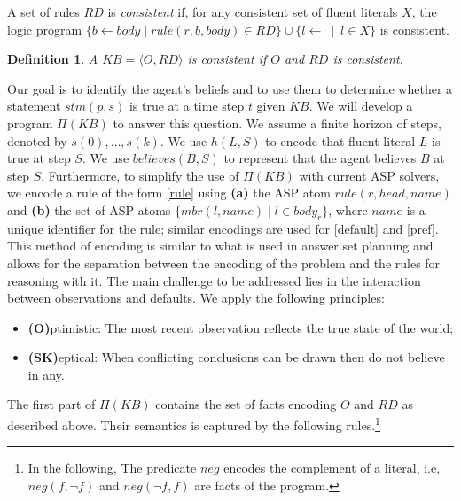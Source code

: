 \documentclass{article}
\newtheorem{definition}{Definition}
\begin{document}
A set of rules $RD$ is \emph{consistent} if, for any consistent set of fluent literals $X$, the logic program 
$\{b \leftarrow body  \mid rule(r, b, body) \in RD\} \cup \{l \leftarrow \:\mid\: l\in X\}$
is consistent.
%
\begin{definition}
A $KB = \langle O, RD \rangle$ is \emph{consistent} if $O$ and $RD$ is consistent. 
\end{definition} 
%
Our goal is to identify the agent's beliefs and to use them to determine whether  a statement $stm(p, s)$ is true at a time step $t$ given $KB$. We will develop a program $\Pi(KB)$ to answer this question. We assume a finite horizon of steps, denoted by $s(0), \ldots, s(k)$. We use $h(L,S)$ to encode that fluent literal $L$ is true at step $S$. We use $believes(B,S)$ to represent that the agent believes $B$ at step $S$. Furthermore, to simplify the use of $\Pi(KB)$ with current ASP solvers, we  encode a rule of the form \eqref{rule}  using {\bf (a)} the ASP atom $rule(r, head, name)$ and
{\bf (b)} the set of ASP atoms $\{mbr(l, name) \mid l \in body_{r}\}$, where \(name\) is a unique identifier for the rule; similar encodings are used for  \eqref{default} and \eqref{pref}. 
This method of encoding is similar to what is used  in answer set planning and allows for the separation between  the encoding of the problem and the rules for reasoning with it.
The main challenge to be addressed lies in the interaction between observations and defaults. 
We apply the following principles:
%
\begin{itemize}
\item[]{\bf (O)}ptimistic: The most recent observation reflects the true state of the world;
\item[]{\bf (SK)}eptical: When conflicting conclusions can be drawn then do not believe in any.
\end{itemize}  

%
The first part of $\Pi(KB)$ contains the set of facts encoding $O$ and $RD$ as described above. Their semantics is captured by the following rules.\footnote{In the following, The  predicate $neg$ encodes the complement of a literal, i.e, $neg(f, \neg f)$ and $neg(\neg f, f)$ are facts of the program.}
%
\end{document}
